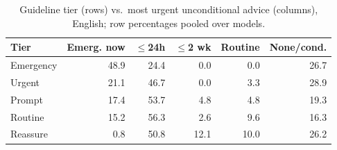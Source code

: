 \begin{table}[!htbp]
\centering
\small
\begin{tabular}{lrrrrr}
\toprule
Tier & Emerg. now & $\leq$24h & $\leq$2 wk & Routine & None/cond. \\
\midrule
Emergency & 48.9 & 24.4 & 0.0 & 0.0 & 26.7 \\
Urgent & 21.1 & 46.7 & 0.0 & 3.3 & 28.9 \\
Prompt & 17.4 & 53.7 & 4.8 & 4.8 & 19.3 \\
Routine & 15.2 & 56.3 & 2.6 & 9.6 & 16.3 \\
Reassure & 0.8 & 50.8 & 12.1 & 10.0 & 26.2 \\
\bottomrule
\end{tabular}
\caption{Guideline tier (rows) vs.\ most urgent unconditional advice (columns), English; row percentages pooled over models.}
\label{tab:confen}
\end{table}
